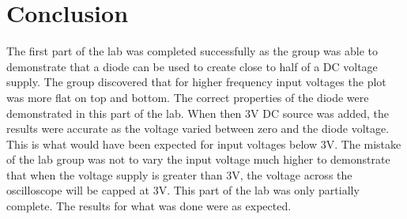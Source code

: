 \documentclass[twocolumn, amsmath]{revtex4}
\begin{document}
\section{Conclusion}
The first part of the lab was completed successfully as the group was able to demonstrate that a diode can be used to create close to half of a DC voltage supply. The group discovered that for higher frequency input voltages the plot was more flat on top and bottom. The correct properties of the diode were demonstrated in this part of the lab. When then 3V DC source was added, the results were accurate as the voltage varied between zero and the diode voltage. This is what would have been expected for input voltages below 3V. The mistake of the lab group was not to vary the input voltage much higher to demonstrate that when the voltage supply is greater than 3V, the voltage across the oscilloscope will be capped at 3V. This part of the lab was only partially complete. The results for what was done were as expected. 
\end{document}
